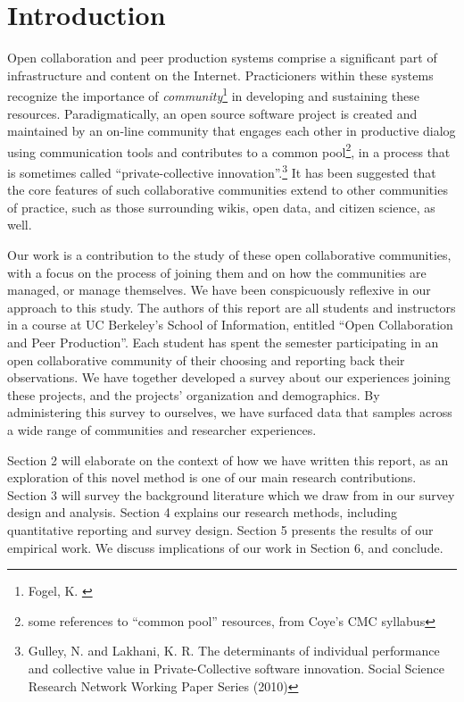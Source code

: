\section{Introduction}

Open collaboration and peer production systems comprise a significant
part of infrastructure and content on the Internet.
Practicioners within these systems recognize the importance of
\emph{community}\footnote{Fogel, K. \cite{Producing Open Source Software}} in developing and sustaining these resources.
Paradigmatically, an open source software project is created and maintained by an on-line community that engages each other in productive dialog using communication tools and contributes to
a common pool\footnote{some references to ``common pool'' resources, from Coye's CMC syllabus}, in a process that is sometimes called ``private-collective innovation''.\footnote{Gulley, N. and Lakhani, K. R. The determinants of individual performance and collective value in Private-Collective software innovation. Social Science Research Network Working Paper Series (2010)}
It has been suggested that the core features of such collaborative
communities extend to other communities of practice, such as those
surrounding wikis, open data, and citizen science, as well.

Our work is a contribution to the study of these open collaborative
communities, with a focus on the process of joining them and on how
the communities are managed, or manage themselves.
We have been conspicuously reflexive in our approach to this study.
The authors of this report are all students and instructors in a
course at UC Berkeley's School of Information, entitled ``Open Collaboration and Peer Production''.
Each student has spent the semester participating in an open
collaborative community of their choosing and reporting back
their observations.
We have together developed a survey about our experiences joining
these projects, and the projects' organization and demographics.
By administering this survey to ourselves, we have surfaced data
that samples across a wide range of communities and researcher experiences.

Section 2 will elaborate on the context of how we have written this report, as an exploration of this novel method is one of our main research contributions.
Section 3 will survey the background literature which we draw from in
our survey design and analysis.
Section 4 explains our research methods, including quantitative
reporting and survey design.
Section 5 presents the results of our empirical work.
We discuss implications of our work in Section 6, and conclude. 


